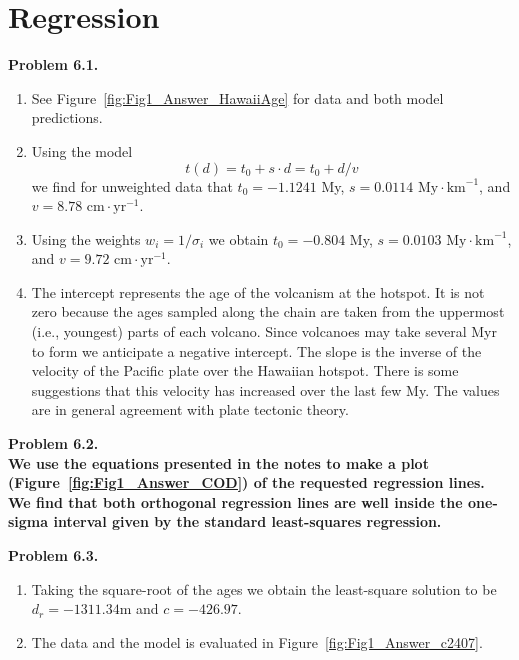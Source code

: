 \section{Regression}

\bf{Problem 6.1.} \\
\begin{enumerate}[label=\alph*)]
\item See Figure~\ref{fig:Fig1_Answer_HawaiiAge} for data and both model predictions.
\item Using the model
$$
t(d) = t_0 + s \cdot d = t_0 + d/v
$$
we find for unweighted data that $t_0 = -1.1241$ My, $s = 0.0114 \mbox{ My}\cdot \mbox{km}^{-1}$, and
$v = 8.78 \mbox{ cm} \cdot \mbox{yr}^{-1}$.

\item Using the weights $w_i = 1/\sigma_i$ we obtain $t_0 = -0.804$ My,
$s = 0.0103 \mbox{ My}\cdot \mbox{km}^{-1}$, and $v = 9.72 \mbox{ cm} \cdot \mbox{yr}^{-1}$.
\item  The intercept represents the age of the
volcanism at the hotspot.  It is not zero because the ages sampled along the chain are taken from
the uppermost (i.e., youngest) parts of each volcano.  Since volcanoes may take several Myr to form
we anticipate a negative intercept.  The slope is the inverse of the velocity of the Pacific plate
over the Hawaiian hotspot.  There is some suggestions that this velocity has increased over the last
few My.  The values are in general agreement with plate tectonic theory.
\end{enumerate}

\noindent
\bf{Problem 6.2.} \\

We use the equations presented in the notes to make a plot (Figure~\ref{fig:Fig1_Answer_COD})
of the requested regression lines.  We find that both orthogonal regression lines are well
inside the one-sigma interval given by the standard least-squares regression.

\noindent
\bf{Problem 6.3.} \\

\begin{enumerate}[label=\alph*)]
	\item Taking the square-root of the ages we obtain the least-square solution to be
	$d_r = -1311.34$m and $c = -426.97$.
	\item The data and the model is evaluated in Figure~\ref{fig:Fig1_Answer_c2407}.
\end{enumerate}

